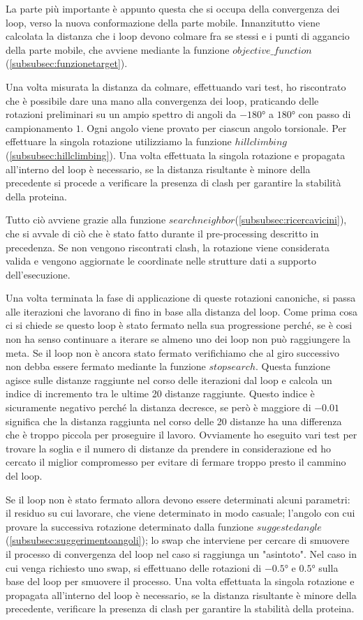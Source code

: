 La parte più importante è appunto questa che si occupa della convergenza dei loop, verso la nuova conformazione della parte mobile. Innanzitutto viene calcolata la distanza che i loop devono colmare fra se stessi e i punti di aggancio della parte mobile, che avviene mediante la funzione $objective\_function$(\ref{subsubsec:funzionetarget}). 

Una volta misurata la distanza da colmare, effettuando vari test, ho riscontrato che è possibile dare una mano alla convergenza dei loop, praticando delle rotazioni preliminari su un ampio spettro di angoli da $\ang{-180}$ a $\ang{180}$ con passo di campionamento $1$. Ogni angolo viene provato per ciascun angolo torsionale. Per effettuare la singola rotazione utilizziamo la funzione $hillclimbing$(\ref{subsubsec:hillclimbing}). Una volta effettuata la singola rotazione e propagata all'interno del loop è necessario, se la distanza risultante è minore della precedente si procede a verificare la presenza di clash per garantire la stabilità della proteina. 

Tutto ciò avviene grazie alla funzione $searchneighbor$(\ref{subsubsec:ricercavicini}), che si avvale di ciò che è stato fatto durante il pre-processing descritto in precedenza. Se non vengono riscontrati clash, la rotazione viene considerata valida e vengono aggiornate le coordinate nelle strutture dati a supporto dell'esecuzione.

Una volta terminata la fase di applicazione di queste rotazioni canoniche, si passa alle iterazioni che lavorano di fino in base alla distanza del loop. Come prima cosa ci si chiede se questo loop è stato fermato nella sua progressione perché, se è cosi non ha senso continuare a iterare se almeno uno dei loop non può raggiungere la meta. Se il loop non è ancora stato fermato verifichiamo che al giro successivo non debba essere fermato mediante la funzione $stopsearch$. Questa funzione agisce sulle distanze raggiunte nel corso delle iterazioni dal loop e calcola un indice di incremento tra le ultime 20 distanze raggiunte. Questo indice è sicuramente negativo perché la distanza decresce, se però è maggiore di $-0.01$ significa che la distanza raggiunta nel corso delle 20 distanze ha una differenza che è troppo piccola per proseguire il lavoro. Ovviamente ho eseguito vari test per trovare la soglia e il numero di distanze da prendere in considerazione ed ho cercato il miglior compromesso per evitare di fermare troppo presto il cammino del loop. 

Se il loop non è stato fermato allora devono essere determinati alcuni parametri: il residuo su cui lavorare, che viene determinato in modo casuale; l'angolo con cui provare la successiva rotazione determinato dalla funzione $suggestedangle$(\ref{subsubsec:suggerimentoangoli}); lo swap che interviene per cercare di smuovere il processo di convergenza del loop nel caso si raggiunga un "asintoto". Nel caso in cui venga richiesto uno swap, si effettuano delle rotazioni di $\ang{-0.5}$ e $\ang{0.5}$ sulla base del loop per smuovere il processo. Una volta effettuata la singola rotazione e propagata all'interno del loop è necessario, se la distanza risultante è minore della precedente, verificare la presenza di clash per garantire la stabilità della proteina.

